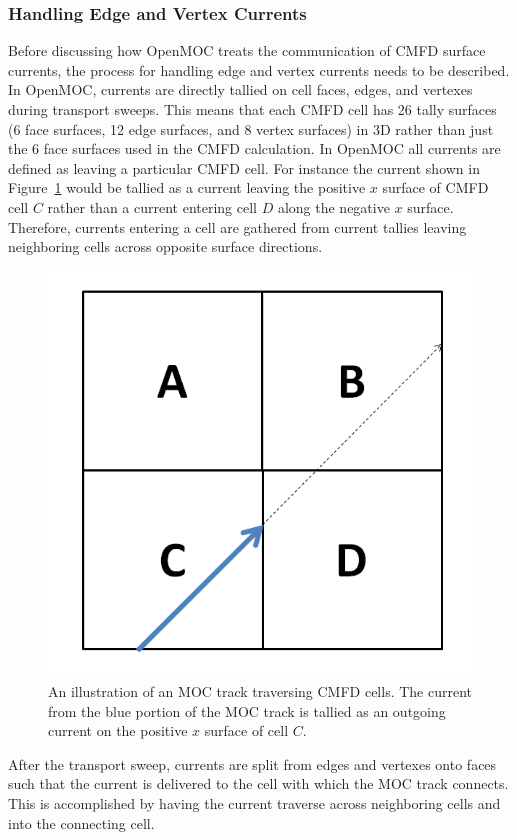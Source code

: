 \subsubsection{Handling Edge and Vertex Currents}

Before discussing how OpenMOC treats the communication of \ac{CMFD} surface currents, the process for handling edge and vertex currents needs to be described. In OpenMOC, currents are directly tallied on cell faces, edges, and vertexes during transport sweeps. This means that each \ac{CMFD} cell has 26 tally surfaces (6 face surfaces, 12 edge surfaces, and 8 vertex surfaces) in 3D rather than just the 6 face surfaces used in the \ac{CMFD} calculation. In OpenMOC all currents are defined as leaving a particular \ac{CMFD} cell. For instance the current shown in Figure~\ref{fig:tally-current} would be tallied as a current leaving the positive $x$ surface of \ac{CMFD} cell $C$ rather than a current entering cell $D$ along the negative $x$ surface. Therefore, currents entering a cell are gathered from current tallies leaving neighboring cells across opposite surface directions.


\begin{figure}[h!]
	\centering
	\includegraphics[width=0.6\linewidth]{figures/DD/current-transfer.PNG}
	\caption[]{An illustration of an \ac{MOC} track traversing \ac{CMFD} cells. The current from the blue portion of the \ac{MOC} track is tallied as an outgoing current on the positive $x$ surface of cell $C$.}
	\label{fig:tally-current}
\end{figure}

After the transport sweep, currents are split from edges and vertexes onto faces such that the current is delivered to the cell with which the \ac{MOC} track connects. This is accomplished by having the current traverse across neighboring cells and into the connecting cell.

